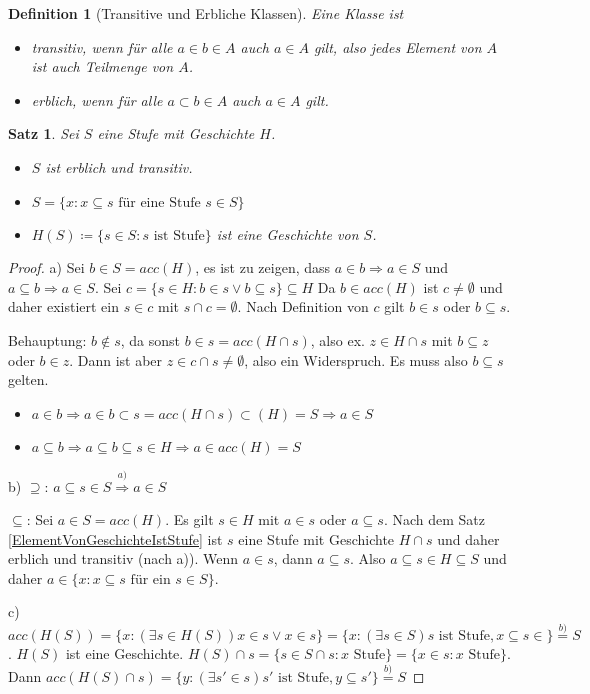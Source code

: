 \documentclass[german]{article}
\theoremstyle{break}
\theoremstyle{def_style}
\newtheorem{definition}{Definition}[section]
\theoremstyle{def_style}
\newtheorem{satz}{Satz}[section]
\theoremstyle{lemma_style}
\begin{document}
\begin{definition} [Transitive und Erbliche Klassen]
	Eine Klasse ist
	\begin{itemize}
		\item \textit{transitiv}, wenn für alle $a\in b\in A$ auch $a\in A$ gilt, also jedes Element von $A$ ist auch Teilmenge von $A$.
		\item \textit{erblich}, wenn für alle $a\subset b \in A$ auch $a\in A$ gilt.
	\end{itemize}
\end{definition}

\begin{satz}
	Sei $S$ eine Stufe mit Geschichte $H$.
	\begin{itemize}
		\item[a)] $S$ ist erblich und transitiv.
		\item[b)] $S=\{x : x\subseteq s \text{ für eine Stufe } s\in S\}$
		\item[c)] $H(S)\coloneqq\{s\in S : s\text{ ist Stufe}\}$ ist eine Geschichte von $S$.
	\end{itemize}
\end{satz}
\begin{proof}
	a) Sei $b\in S=acc(H)$, es ist zu zeigen, dass $a\in b\Rightarrow a\in S$ und $a\subseteq b \Rightarrow a\in S$. Sei $c=\{s\in H : b\in s \lor b \subseteq s\}\subseteq H$ Da $b\in acc(H)$ ist $c\neq \emptyset$ und daher existiert ein $s\in c$ mit $s\cap c=\emptyset$. Nach Definition von $c$ gilt $b\in s$ oder $b\subseteq s$. 
	
	Behauptung: $b\notin s$, da sonst $b\in s = acc(H\cap s)$, also ex. $z\in H\cap s$ mit $b\subseteq z$ oder $b\in z$. Dann ist aber $z\in c\cap s\neq \emptyset$, also ein Widerspruch. Es muss also $b\subseteq s$ gelten. 
	\begin{itemize}
		\item $a\in b \Rightarrow a \in b \subset s=acc(H\cap s)\subset(H)=S\Rightarrow a\in S$
		\item $a\subseteq b\Rightarrow a\subseteq b \subseteq s\in H \Rightarrow a\in acc(H)=S$
	\end{itemize}

	b) \glqq$\supseteq$\grqq: $a\subseteq s \in S\stackrel{a)}{\Rightarrow}a\in S$
	
	\glqq$\subseteq$\grqq{}: Sei $a\in S=acc(H)$. Es gilt $s\in H$ mit $a\in s$ oder $a\subseteq s$. Nach dem Satz \ref{ElementVonGeschichteIstStufe} ist $s$ eine Stufe mit Geschichte $H\cap s$ und daher erblich und transitiv (nach a)). Wenn $a\in s$, dann $a\subseteq s$. Also $a\subseteq s\in H\subseteq S$ und daher $a\in\{x : x\subseteq s \text{ für ein } s\in S\}$.
	
	c) $acc(H(S))=\{x : (\exists s\in H(S)) x\in s \lor x\in s\} = \{x : (\exists s \in S) s \text{ ist Stufe}, x\subseteq s\in\}\stackrel{b)}{=}S$. $H(S)$ ist eine Geschichte. $H(S)\cap s=\{s\in S\cap s : x \text{ Stufe}\}=\{x\in s : x \text{ Stufe}\}$. Dann $acc(H(S)\cap s)=\{y : (\exists s'\in s) s' \text{ ist Stufe}, y\subseteq s'\}\stackrel{b)}{=}S$
 \end{proof}
\end{document}
